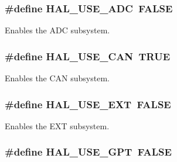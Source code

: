 \subsubsection[{H\+A\+L\+\_\+\+U\+S\+E\+\_\+\+A\+D\+C}]{\setlength{\rightskip}{0pt plus 5cm}\#define H\+A\+L\+\_\+\+U\+S\+E\+\_\+\+A\+D\+C~F\+A\+L\+S\+E}\label{group___h_a_l___c_o_n_f_ga413a1b6c0ca2c9e524df50ceac1275fd}


Enables the A\+D\+C subsystem. 

\hypertarget{group___h_a_l___c_o_n_f_ga2e351185eace5acfd90b65c9fe796355}{}
\subsubsection[{H\+A\+L\+\_\+\+U\+S\+E\+\_\+\+C\+A\+N}]{\setlength{\rightskip}{0pt plus 5cm}\#define H\+A\+L\+\_\+\+U\+S\+E\+\_\+\+C\+A\+N~T\+R\+U\+E}\label{group___h_a_l___c_o_n_f_ga2e351185eace5acfd90b65c9fe796355}


Enables the C\+A\+N subsystem. 

\hypertarget{group___h_a_l___c_o_n_f_ga2dd40c0fdd833b861f9241f6d282fe34}{}
\subsubsection[{H\+A\+L\+\_\+\+U\+S\+E\+\_\+\+E\+X\+T}]{\setlength{\rightskip}{0pt plus 5cm}\#define H\+A\+L\+\_\+\+U\+S\+E\+\_\+\+E\+X\+T~F\+A\+L\+S\+E}\label{group___h_a_l___c_o_n_f_ga2dd40c0fdd833b861f9241f6d282fe34}


Enables the E\+X\+T subsystem. 

\hypertarget{group___h_a_l___c_o_n_f_gab4702b9e1b6fa2869e26c274fccd53f0}{}
\subsubsection[{H\+A\+L\+\_\+\+U\+S\+E\+\_\+\+G\+P\+T}]{\setlength{\rightskip}{0pt plus 5cm}\#define H\+A\+L\+\_\+\+U\+S\+E\+\_\+\+G\+P\+T~F\+A\+L\+S\+E}\label{group___h_a_l___c_o_n_f_gab4702b9e1b6fa2869e26c274fccd53f0}


